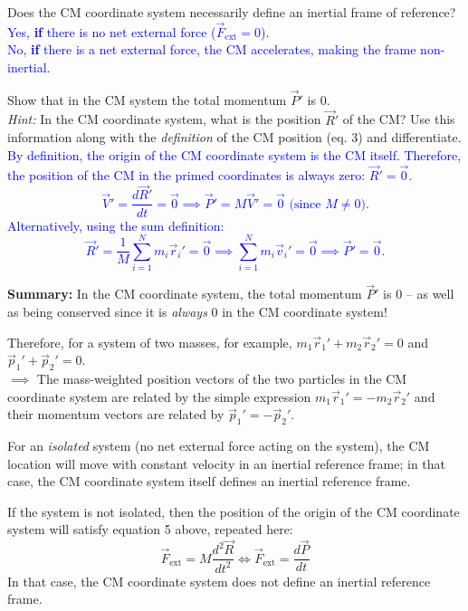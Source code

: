 \documentclass[11pt, letterpaper, openany]{book}
\newenvironment{exercise}[1][Exercise]{%
  \tcolorbox[blanker, breakable, left=1em,
    before skip=1em, after skip=1em,
    borderline west={3pt}{0pt}{PhysNavy},
    colback=PhysCream,
    before upper={\textcolor{PhysNavy}{\sffamily\bfseries #1:}\space}
  ]%
}{%
  \endtcolorbox%
}
\begin{document}
\begin{exercise}[Exercise 5]
Does the CM coordinate system necessarily define an inertial frame of reference? \\
\textcolor{blue}{Yes, \textbf{if} there is no net external force ($\vec{F}_{\text{ext}} = 0$). \\
No, \textbf{if} there is a net external force, the CM accelerates, making the frame non-inertial.}
\end{exercise}

\begin{exercise}[Exercise 6]
Show that in the CM system the total momentum $\vec{P}'$ is 0. \\
\textit{Hint:} In the CM coordinate system, what is the position $\vec{R}'$ of the CM? Use this information along with the \textit{definition} of the CM position (eq. 3) and differentiate. \\
\textcolor{blue}{
By definition, the origin of the CM coordinate system is the CM itself. Therefore, the position of the CM in the primed coordinates is always zero: $\vec{R}' = \vec{0}$.
\[ \vec{V}' = \frac{d\vec{R}'}{dt} = \vec{0} \implies \vec{P}' = M\vec{V}' = \vec{0} \text{ (since } M \neq 0). \]
Alternatively, using the sum definition:
\[ \vec{R}' = \frac{1}{M}\sum_{i=1}^N m_i\vec{r}_i' = \vec{0} \implies \sum_{i=1}^N m_i\vec{v}_i' = \vec{0} \implies \vec{P}' = \vec{0}. \]
}
\end{exercise}

\textbf{Summary:} In the CM coordinate system, the total momentum $\vec{P}'$ is 0 -- as well as being conserved since it is \textit{always} 0 in the CM coordinate system!

Therefore, for a system of two masses, for example, $m_1\vec{r}_1' + m_2\vec{r}_2' = 0$ and $\vec{p}_1' + \vec{p}_2' = 0$. \\
$\implies$ The mass-weighted position vectors of the two particles in the CM coordinate system are related by the simple expression $m_1\vec{r}_1' = -m_2\vec{r}_2'$ and their momentum vectors are related by $\vec{p}_1' = -\vec{p}_2'$.

For an \textit{isolated} system (no net external force acting on the system), the CM location will move with constant velocity in an inertial reference frame; in that case, the CM coordinate system itself defines an inertial reference frame.

If the system is not isolated, then the position of the origin of the CM coordinate system will satisfy equation 5 above, repeated here:
\[ \vec{F}_{\text{ext}} = M\frac{d^2\vec{R}}{dt^2} \iff \vec{F}_{\text{ext}} = \frac{d\vec{P}}{dt} \tag{6} \]
In that case, the CM coordinate system does not define an inertial reference frame.
\end{document}
